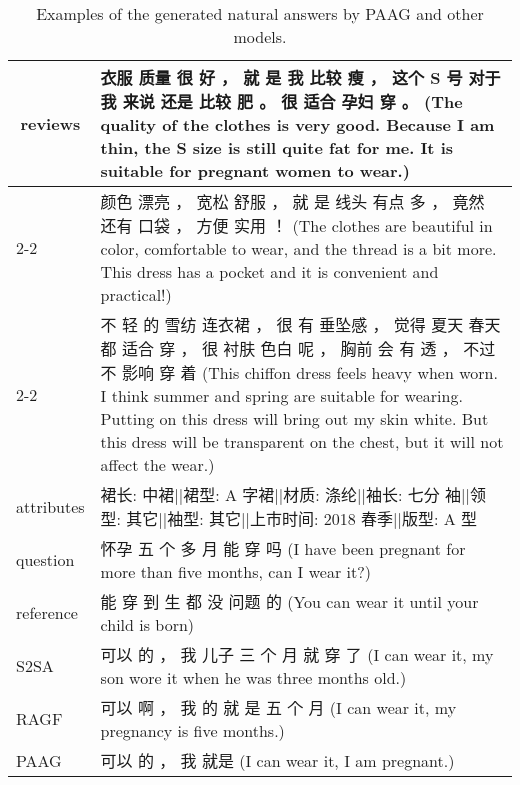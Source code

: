 \begin{CJK*}{UTF8}{gbsn}
\begin{table}[t]
\centering
\caption{Examples of the generated natural answers by PAAG and other models.}
\scriptsize
\vspace{-5mm}
\begin{tabular}{l|l}
\toprule
\multicolumn{1}{c|}{\multirow{6}{*}{reviews}} & \multicolumn{1}{p{6.5cm}}{衣服 质量 很 好 ， 就 是 我 比较 瘦 ， 这个 S 号 对于 我 来说 还是 比较 肥 。 很 适合 孕妇 穿 。 (The quality of the clothes is very good. Because I am thin, the S size is still quite fat for me. It is suitable for pregnant women to wear.)}     \\ \cline{2-2} 
\multicolumn{1}{c|}{}                         & \multicolumn{1}{p{6.5cm}}{颜色 漂亮 ， 宽松 舒服 ， 就 是 线头 有点 多 ， 竟然 还有 口袋 ， 方便 实用 ！ (The clothes are beautiful in color, comfortable to wear, and the thread is a bit more. This dress has a pocket and it is convenient and practical!)}      \\ \cline{2-2} 
\multicolumn{1}{c|}{}                         & \multicolumn{1}{p{6.5cm}}{不 轻 的 雪纺 连衣裙 ， 很 有 垂坠感 ， 觉得 夏天 春天 都 适合 穿 ， 很 衬肤 色白 呢 ， 胸前 会 有 透 ， 不过 不 影响 穿 着 (This chiffon dress feels heavy when worn. I think summer and spring are suitable for wearing. Putting on this dress will bring out my skin white. But this dress will be transparent on the chest, but it will not affect the wear.)}      \\ \hline
attributes                                    & \multicolumn{1}{p{6.5cm}}{裙长: 中裙||裙型: A 字裙||材质: 涤纶||袖长: 七分 袖||领型: 其它||袖型: 其它||上市时间: 2018 春季||版型: A 型}     \\ \hline
question                                     & \multicolumn{1}{p{6.5cm}}{怀孕 五 个 多 月 能 穿 吗 (I have been pregnant for more than five months, can I wear it?)}   \\ 
\hline
reference                                     & \multicolumn{1}{p{6.5cm}}{能 穿 到 生 都 没 问题 的 (You can wear it until your child is born)}   \\ \hline
S2SA                                          & \multicolumn{1}{p{6.5cm}}{可以 的 ， 我 儿子 三 个 月 就 穿 了 (I can wear it, my son wore it when he was three months old.)}    \\ \hline
RAGF                                          & \multicolumn{1}{p{6.5cm}}{可以 啊 ， 我 的 就 是 五 个 月 (I can wear it, my pregnancy is five months.)}  \\ \hline
PAAG                                          & \multicolumn{1}{p{6.5cm}}{可以 的 ， 我 就是 (I can wear it, I am pregnant.)} \\ 
\bottomrule
\end{tabular}
\vspace{-3mm}
\label{tab:case}
\end{table}
\end{CJK*}

